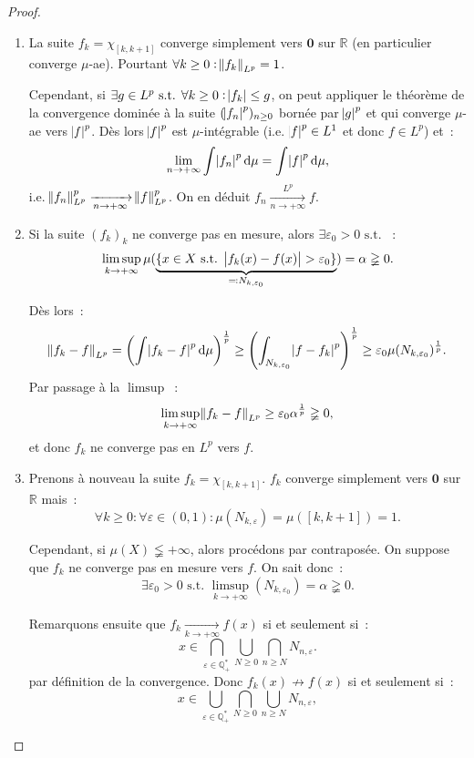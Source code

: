 \documentclass{article}
\theoremstyle{definition}
\newcommand{\pinfty}{{+\infty}}
\newcommand{\st}{\text{ s.t. }}
\newcommand{\Q}{{\mathbb Q}}
\newcommand{\R}{{\mathbb R}}
\begin{document}
\begin{proof}~
\begin{enumerate}
	\item La suite $f_k = \chi_{[k, k+1]}$ converge simplement vers $\mathbf 0$ sur $\R$ (en particulier converge $\mu$-ae). Pourtant $\forall k \geq 0 : \norm {f_k}_{L^p} = 1$.

	Cependant, si $\exists g \in L^p \st \forall k \geq 0 : \abs {f_k} \leq g$, on peut appliquer le théorème de la convergence dominée à la suite $(\abs {f_n}^p)_{n \geq 0}$
	bornée par $\abs g^p$ et qui converge $\mu$-ae vers $\abs f^p$. Dès lors $\abs f^p$ est $\mu$-intégrable (i.e. $\abs f^p \in L^1$ et donc $f \in L^p$) et~:
	\[\lim_{n \to \pinfty}\int \abs {f_n}^p\dif\mu = \int \abs f^p\dif\mu,\]
	i.e. $\norm {f_n}_{L^p}^p \xrightarrow[n \to \pinfty]{} \norm f_{L^p}^p$. On en déduit $f_n \xrightarrow[n \to \pinfty]{L^p} f$.

	\item Si la suite $(f_k)_k$ ne converge pas en mesure, alors $\exists \varepsilon_0 > 0 \st$~:
	\[\limsup_{k \to \pinfty}\mu(\underbrace {\{x \in X \st \abs {f_k(x)-f(x)} > \varepsilon_0\}}_{\eqqcolon N_{k,\varepsilon_0}}) = \alpha \gneqq 0.\]

	Dès lors~:
	\[\norm {f_k-f}_{L^p} = \left(\int\abs {f_k-f}^p\dif\mu\right)^{\frac 1p} \geq \left(\int_{N_{k,\varepsilon_0}}\abs {f-f_k}^p\right)^{\frac 1p}
	\geq \varepsilon_0\mu(N_{k,\varepsilon_0})^{\frac 1p}.\]
	Par passage à la $\limsup$~:
	\[\limsup_{k \to \pinfty}\norm {f_k-f}_{L^p} \geq \varepsilon_0\alpha^{\frac 1p} \gneqq 0,\]
	et donc $f_k$ ne converge pas en $L^p$ vers $f$.

	\item Prenons à nouveau la suite $f_k = \chi_{[k, k+1]}$. $f_k$ converge simplement vers $\mathbf 0$ sur $\R$ mais~:
	\[\forall k \geq 0 : \forall \varepsilon \in (0, 1) : \mu(N_{k,\varepsilon}) = \mu([k, k+1]) = 1.\]

	Cependant, si $\mu(X) \lneqq \pinfty$, alors procédons par contraposée. On suppose que $f_k$ ne converge pas en mesure vers $f$. On sait donc~:
	\[\exists \varepsilon_0 > 0 \st \limsup_{k \to \pinfty}(N_{k,\varepsilon_0}) = \alpha \gneqq 0.\]

	Remarquons ensuite que $f_k \xrightarrow[k \to \pinfty]{} f(x)$ si et seulement si~:
	\[x \in \bigcap_{\varepsilon \in \Q_+^*}\bigcup_{N \geq 0}\bigcap_{n \geq N}N_{n,\varepsilon}.\]
	par définition de la convergence. Donc $f_k(x) \not \to f(x)$ si et seulement si~:
	\[x \in \bigcup_{\varepsilon \in \Q_+^*}\bigcap_{N \geq 0}\bigcup_{n \geq N}N_{n,\varepsilon},\]


\end{enumerate}
\end{proof}
\end{document}
